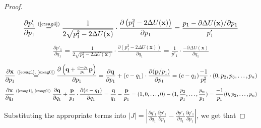 \documentclass{article} %
\newcommand{\bvec}[1]{\textbf{#1}}
\begin{document}
\begin{proof}
\begin{align}
\end{align}
%
\begin{align}\label{e:fok1}
\frac{\partial p'_1}{\partial p_1}
\overset{\text{(\ref{e:sag4})}}=
\frac{1}{2\sqrt{p_1^2 - 2 \Delta U(\bvec{x})}}
\cdot
\frac{\partial\left(p_1^2 - 2 \Delta U(\bvec{x})\right)}{\partial p_1}
=
\frac{p_1 -  \partial{\Delta U(\bvec{x})} / \partial p_1}{p'_1}
\end{align}
%
\begin{align}\label{e:fok2}
\frac{\partial p'_1}{\partial q_1}
=
\frac{1}{2\sqrt{p_1^2 - 2 \Delta U(\bvec{x})}}
\cdot
\frac{\partial\left(p_1^2 - 2 \Delta U(\bvec{x})\right)}{\partial q_1}
=
\frac{1}{p'_1} \cdot \frac{-\partial{\Delta U(\bvec{x})}}{\partial q_1}
\end{align}
%
\begin{align}\label{e:zoro1}
\frac{\partial \bvec{x}}{\partial{p_1}}
\overset{\text{(\ref{e:sag1}, \ref{e:sag0})}}
=
\frac{
\partial \left(\bvec{q} + \frac{c-q_1}{p_1}\bvec{p} \right)
}
{\partial p_1} 
=
\frac{
\partial \bvec{q}}
{\partial{p_1}}
 + 
(c-q_1)
\cdot 
\frac{
\partial(\bvec{p}/p_1) 
}{\partial{p_1}}
=
(c - q_1)\frac{-1}{p_1^2}
\cdot
(0, p_2, p_3, \ldots, p_n)
\end{align}
%
\begin{align}\label{e:zoro2}
\frac{\partial \bvec{x}}{\partial{q_1}}
\overset{\text{(\ref{e:sag1}, \ref{e:sag0})}}
=
\frac{
\partial \bvec{q}}
{\partial{q_1}}
 + 
\frac
{\bvec{p}}
{p_1}
\cdot
\frac
{\partial(c-q_1)}
{\partial q_1}
=
\frac{\bvec{q}}{q_1}
-
\frac{\bvec{p}}{p_1}
=
(1, 0, \ldots, 0 ) - (1, \frac{p_2}{p_1}, \ldots, \frac{p_n}{p_1})
= \frac{-1}{p_1}(0, p_2, \ldots, p_n)
\end{align}

Substituting the appropriate terms into $|J|=|\frac{\partial q'_{1}}{\partial q_{1}} \frac{\partial p'_{1}}{\partial p_{1}} - \frac{\partial p'_{1}}{\partial q_{1}} \frac{\partial q'_{1}}{\partial p_{1}}|$, we get that


\end{proof}
\end{document}
